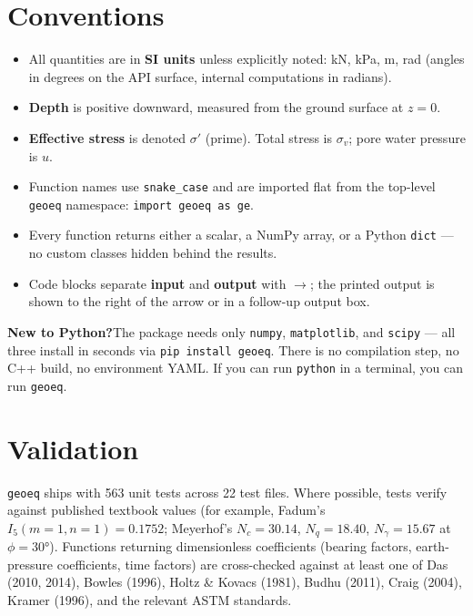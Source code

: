 \documentclass[11pt,a4paper,openany]{book}
\newcommand{\geo}{\texttt{geoeq}}
\newcommand{\sigmaeff}{\sigma'}
\newcommand{\sigmav}{\sigma_v}
\newcommand{\Out}{\quad\(\rightarrow\)\quad}
\begin{document}
\section*{Conventions}
\begin{itemize}[leftmargin=*]
\item All quantities are in \textbf{SI units} unless explicitly
      noted: \si{\kilo\newton}, \si{\kilo\pascal}, \si{\meter},
      \si{\radian} (angles in degrees on the API surface, internal
      computations in radians).
\item \textbf{Depth} is positive downward, measured from the ground
      surface at $z = 0$.
\item \textbf{Effective stress} is denoted $\sigmaeff$ (prime).
      Total stress is $\sigmav$; pore water pressure is $u$.
\item Function names use \texttt{snake\_case} and are imported flat
      from the top-level \texttt{geoeq} namespace:
      \lstinline|import geoeq as ge|.
\item Every function returns either a scalar, a NumPy array, or a
      Python \texttt{dict} --- no custom classes hidden behind the
      results.
\item Code blocks separate \textbf{input} and \textbf{output} with
      \texttt{\Out}; the printed output is shown to the right of
      the arrow or in a follow-up output box.
\end{itemize}

\begin{tipbox}
\textbf{New to Python?}\quad The package needs only
\texttt{numpy}, \texttt{matplotlib}, and \texttt{scipy} --- all
three install in seconds via \texttt{pip install geoeq}. There is
no compilation step, no C++ build, no environment YAML. If you
can run \texttt{python} in a terminal, you can run \geo{}.
\end{tipbox}

\section*{Validation}
\geo{} ships with 563 unit tests across 22 test files. Where
possible, tests verify against published textbook values
(for example, Fadum's $I_5(m{=}1, n{=}1) = 0.1752$; Meyerhof's
$N_c {=} 30.14$, $N_q {=} 18.40$, $N_\gamma {=} 15.67$ at
$\phi {=} 30°$). Functions returning dimensionless coefficients
(bearing factors, earth-pressure coefficients, time factors) are
cross-checked against at least one of Das (2010, 2014), Bowles
(1996), Holtz \& Kovacs (1981), Budhu (2011), Craig (2004),
Kramer (1996), and the relevant ASTM standards.
\end{document}
